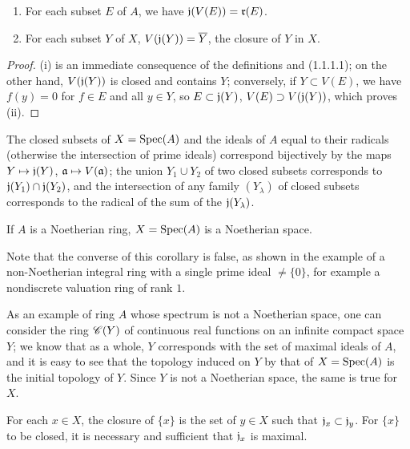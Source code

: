 \begin{prop}[1.1.4]
\label{1.1.1.4}
\medskip\noindent
\begin{enumerate}[label=\emph{(\roman*)}]
  \item For each subset $E$ of $A$, we have $\mathfrak{j}(V(E))=\mathfrak{r}(E)$.
  \item For each subset $Y$ of $X$, $V(\mathfrak{j}(Y))=\overline{Y}$, the closure of $Y$ in $X$.
\end{enumerate}
\end{prop}

\begin{proof}
\label{proof-1.1.1.4}
(i) is an immediate consequence of the definitions and (1.1.1.1); on the other hand,
$V(\mathfrak{j}(Y))$ is closed and contains $Y$; conversely, if $Y\subset V(E)$, we have
$f(y)=0$ for $f\in E$ and all $y\in Y$, so $E\subset\mathfrak{j}(Y)$,
$V(E)\supset V(\mathfrak{j}(Y))$, which proves (ii).
\end{proof}

\begin{cor}[1.1.5]
\label{1.1.1.5}
The closed subsets of $X={\mathop{\mathrm{Spec}}\nolimits}(A)$ and the ideals of $A$ equal to their radicals (otherwise
the intersection of prime ideals) correspond bijectively by the  maps
$Y\mapsto\mathfrak{j}(Y)$, $\mathfrak{a}\mapsto V(\mathfrak{a})$; the union $Y_1\cup Y_2$ of
two closed subsets corresponds to $\mathfrak{j}(Y_1)\cap\mathfrak{j}(Y_2)$, and the
intersection of any family $(Y_\lambda)$ of closed subsets corresponds to the radical of the
sum of the $\mathfrak{j}(Y_\lambda)$.
\end{cor}

\begin{cor}[1.1.6]
\label{1.1.1.6}
If $A$ is a Noetherian ring, $X={\mathop{\mathrm{Spec}}\nolimits}(A)$ is a Noetherian space.
\end{cor}

Note that the converse of this corollary is false, as shown
in the example of a non-Noetherian integral ring with a single prime ideal $\neq\{0\}$, for
example a nondiscrete valuation ring of rank $1$.

As an example of ring $A$ whose spectrum is not a Noetherian space, one can consider the ring
$\mathscr{C}(Y)$ of continuous real functions on an infinite compact space $Y$; we know that as a
whole, $Y$ corresponds with the set of maximal ideals of $A$, and it is easy to see that the
topology induced on $Y$ by that of $X={\mathop{\mathrm{Spec}}\nolimits}(A)$ is the initial topology of $Y$. Since $Y$ is
not a Noetherian space, the same is true for $X$.

\begin{cor}[1.1.7]
\label{1.1.1.7}
For each $x\in X$, the closure of $\{x\}$ is the set of $y\in X$ such that
$\mathfrak{j}_x\subset\mathfrak{j}_y$. For $\{x\}$ to be closed, it is necessary and
sufficient that $\mathfrak{j}_x$ is maximal.
\end{cor}

